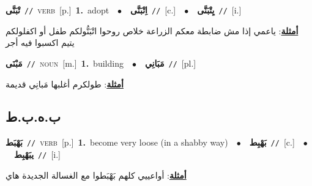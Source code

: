 \documentclass[10pt,a4paper,twoside]{article} %
\begin{document}
\begin{multicols}{2}
{\setlength\topsep{0pt}\textbf{\foreignlanguage{arabic}{تْبَنَّى}}\ {\color{gray}\texttt{//}\color{black}}\ \textsc{verb}\ [p.]\ \textbf{1.}~adopt\ \ $\bullet$\ \ \setlength\topsep{0pt}\textbf{\foreignlanguage{arabic}{اِتْبَنَّى}}\ {\color{gray}\texttt{//}\color{black}}\ [c.]\ \ $\bullet$\ \ \setlength\topsep{0pt}\textbf{\foreignlanguage{arabic}{يِتْبَنَّى}}\ {\color{gray}\texttt{//}\color{black}}\ [i.]\  \begin{flushright}\color{gray}\foreignlanguage{arabic}{\textbf{\underline{\foreignlanguage{arabic}{أمثلة}}}: ياعمي إذا مش ضابطة معكم الزراعة خلاص روحوا اتْبَنُّولكم طفل أو اكفلولكم يتيم اكسبوا فيه أجر}\end{flushright}\color{black}} \vspace{2mm}

{\setlength\topsep{0pt}\textbf{\foreignlanguage{arabic}{مَبْنَى}}\ {\color{gray}\texttt{//}\color{black}}\ \textsc{noun}\ [m.]\ \textbf{1.}~building\ \ $\bullet$\ \ \setlength\topsep{0pt}\textbf{\foreignlanguage{arabic}{مَبَانِي}}\ {\color{gray}\texttt{//}\color{black}}\ [pl.]\  \begin{flushright}\color{gray}\foreignlanguage{arabic}{\textbf{\underline{\foreignlanguage{arabic}{أمثلة}}}: طولكرم أغلبها مَبانِي قديمة}\end{flushright}\color{black}} \vspace{2mm}

\vspace{-3mm}
\subsection*{\color{blue}\foreignlanguage{arabic}{ب.ه.ب.ط}\color{blue}{}} 

{\setlength\topsep{0pt}\textbf{\foreignlanguage{arabic}{بَهْبَط}}\ {\color{gray}\texttt{//}\color{black}}\ \textsc{verb}\ [p.]\ \textbf{1.}~become very loose (in a shabby way)\ \ $\bullet$\ \ \setlength\topsep{0pt}\textbf{\foreignlanguage{arabic}{بَهْبِط}}\ {\color{gray}\texttt{//}\color{black}}\ [c.]\ \ $\bullet$\ \ \setlength\topsep{0pt}\textbf{\foreignlanguage{arabic}{يبَهْبِط}}\ {\color{gray}\texttt{//}\color{black}}\ [i.]\  \begin{flushright}\color{gray}\foreignlanguage{arabic}{\textbf{\underline{\foreignlanguage{arabic}{أمثلة}}}: أواعييي كلهم بَهْبَطوا مع الغسالة الجديدة هاي}\end{flushright}\color{black}} \vspace{2mm}


\end{multicols}
\end{document}
